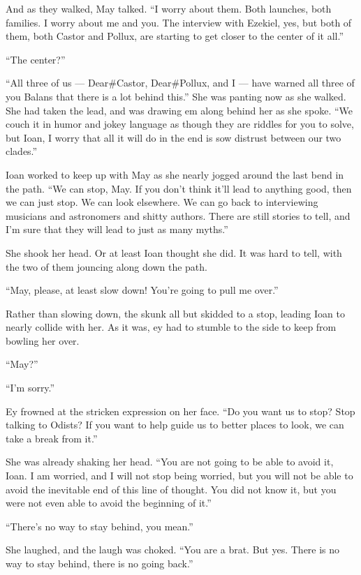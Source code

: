 And as they walked, May talked. ``I worry about them. Both launches, both families. I worry about me and you. The interview with Ezekiel, yes, but both of them, both Castor and Pollux, are starting to get closer to the center of it all.''

``The center?''

``All three of us — Dear\#Castor, Dear\#Pollux, and I — have warned all three of you Balans that there is a lot behind this.'' She was panting now as she walked. She had taken the lead, and was drawing em along behind her as she spoke. ``We couch it in humor and jokey language as though they are riddles for you to solve, but Ioan, I worry that all it will do in the end is sow distrust between our two clades.''

Ioan worked to keep up with May as she nearly jogged around the last bend in the path. ``We can stop, May. If you don't think it'll lead to anything good, then we can just stop. We can look elsewhere. We can go back to interviewing musicians and astronomers and shitty authors. There are still stories to tell, and I'm sure that they will lead to just as many myths.''

She shook her head. Or at least Ioan thought she did. It was hard to tell, with the two of them jouncing along down the path.

``May, please, at least slow down! You're going to pull me over.''

Rather than slowing down, the skunk all but skidded to a stop, leading Ioan to nearly collide with her. As it was, ey had to stumble to the side to keep from bowling her over.

``May?''

``I'm sorry.''

Ey frowned at the stricken expression on her face. ``Do you want us to stop? Stop talking to Odists? If you want to help guide us to better places to look, we can take a break from it.''

She was already shaking her head. ``You are not going to be able to avoid it, Ioan. I am worried, and I will not stop being worried, but you will not be able to avoid the inevitable end of this line of thought. You did not know it, but you were not even able to avoid the beginning of it.''

``There's no way to stay behind, you mean.''

She laughed, and the laugh was choked. ``You are a brat. But yes. There is no way to stay behind, there is no going back.''

